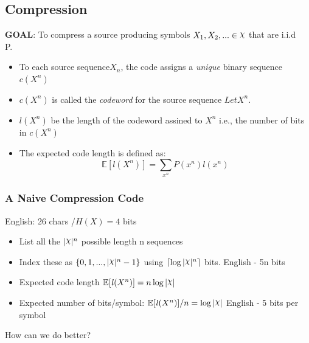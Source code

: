 \documentclass[12pt]{article}
\DeclareRobustCommand{\rchi}{{\mathpalette\irchi\relax}}
\newcommand{\irchi}[2]{\raisebox{\depth}{$#1\chi$}} %
\begin{document}
\subsection{Compression}
\textbf{GOAL}: To compress a source producing symbols $X_1,X_2,... \in \rchi$ that are i.i.d ~ P.
\begin{itemize}
\item To each source sequence$X_n$, the code assigns a \textit{unique} binary sequence $c(X^n)$
\item $c(X^n)$ is called the \textit{codeword} for the source sequence $Let X^n$.
\item $\mathit{l}(X^n) $ be the length of the codeword assined to $X^n$ i.e., the number of bits in $c(X^n)$
\item The expected code length is defined as:
$$\mathbb{E}[\mathit{l}(X^n)] = \sum_{x^n}P(x^n)\mathit{l}(x^n)$$
\end{itemize}
\subsubsection{A Naive Compression Code}
English: 26 chars /$ H(X) = 4$ bits
\begin{itemize}
\item List all the $|\rchi|^n$ possible length n sequences 
\item Index these as $\{0,1,...,|\rchi|^n -1 \}$ using $\lceil \log |\rchi|^n \rceil$ bits. English - 5n bits 
\item Expected code length $\mathbb{E}[\mathit{l}(X^n)] = n \log |\rchi|$
\item Expected number of bits/symbol: $\mathbb{E}[\mathit{l}(X^n)] / n = \log |\rchi|$ English - 5 bits per symbol 
\end{itemize}

How can we do better?
\end{document}
